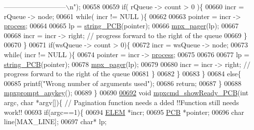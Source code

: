 \begin{DoxyCode}
{{{      ---------------------------\(\backslash\)n"});
00658                 
00659                 \textcolor{keywordflow}{if}( rQueue -> count > 0 )\{
00660                 incr = rQueue -> node;
00661                 \textcolor{keywordflow}{while}( incr != NULL )\{
00662                         
00663                         pointer = incr -> \hyperlink{structprocess}{process};
00664                 
00665                         lp = \hyperlink{mpx__r2_8c_aa1ebf78ebfc66e910acd6efdcf6b2437}{string_PCB}(pointer);
00666                         \hyperlink{mpx__util_8c_a9e59881f10bd91d7255f18f205e101e6}{mpx_pager}(lp);
00667                         
00668                         incr = incr -> right; \textcolor{comment}{// progress forward to the right of
       the queue}
00669                 \}
00670             \} 
00671                 \textcolor{keywordflow}{if}(wsQueue -> count > 0)\{
00672                 incr = wsQueue -> node;
00673                 \textcolor{keywordflow}{while}( incr != NULL )\{
00674                         pointer = incr -> \hyperlink{structprocess}{process};
00675                 
00676                         
00677                         lp = \hyperlink{mpx__r2_8c_aa1ebf78ebfc66e910acd6efdcf6b2437}{string_PCB}(pointer);
00678                         \hyperlink{mpx__util_8c_a9e59881f10bd91d7255f18f205e101e6}{mpx_pager}(lp);
00679                         
00680                         incr = incr -> right; \textcolor{comment}{// progress forward to the right of
       the queue}
00681                 \}
00682                 \}
00683         \}
00684         \textcolor{keywordflow}{else}\{
00685                 printf(\textcolor{stringliteral}{"Wrong number of arguments used"});       
00686                 \textcolor{keywordflow}{return};
00687         \}
00688         \hyperlink{mpx__util_8c_a338d01dfe3c80732c00450203c85b964}{mpxprompt_anykey}();
00689 \}
00690 
\hypertarget{mpx__r2_8c_source_l00692}{}\hyperlink{mpx__r2_8h_aeaac6d37294f767e31c3789971c5ecd4}{00692} \textcolor{keywordtype}{void} \hyperlink{mpx__r2_8c_aeaac6d37294f767e31c3789971c5ecd4}{mpxcmd_showReady_PCB}(\textcolor{keywordtype}{int} argc, \textcolor{keywordtype}{char} *argv[])\{ \textcolor{comment}{// Pagination function needs a
      dded !!Function still needs work!!}
00693         \textcolor{keywordflow}{if}(argc==1)\{
00694                 \hyperlink{structpage}{ELEM} *incr;
00695                 \hyperlink{structprocess}{PCB} *pointer;
00696                 \textcolor{keywordtype}{char} line[MAX\_LINE];
00697                 \textcolor{keywordtype}{char}* lp;
}}
\end{DoxyCode}
